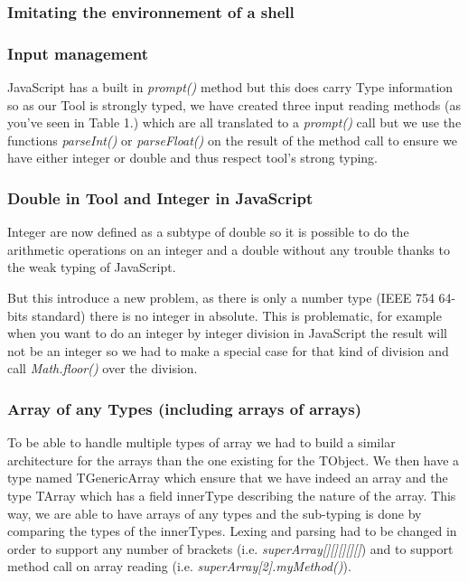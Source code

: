 \subsubsection{Imitating the environnement of a shell}
\subsubsection{Input management}
JavaScript has a built in \emph{prompt()} method but this does carry Type information so as our Tool is strongly typed, we have created three input reading methods (as you've seen in Table 1.) which are all translated to a \emph{prompt()} call but we use the functions \emph{parseInt()} or \emph{parseFloat()} on the result of the method call to ensure we have either integer or double and thus respect tool's strong typing.


\subsubsection{Double in Tool and Integer in JavaScript}
Integer are now defined as a subtype of double so it is possible to do the arithmetic operations on an integer and a double without any trouble thanks to the weak typing of JavaScript.

But this introduce a new problem, as there is only a number type (IEEE 754 64-bits standard) there is no integer in absolute. This is problematic, for example when you want to do an integer by integer division
in JavaScript the result will not be an integer so we had to make a special case for that kind of division and call \emph{Math.floor()} over the division.

\subsubsection{Array of any Types (including arrays of arrays)}
To be able to handle multiple types of array we had to build a similar architecture for the arrays than the one existing for the TObject. We then have a type named TGenericArray which ensure that we have indeed an array and the type TArray which has a field innerType describing the nature of the array.
This way, we are able to have arrays of any types and the sub-typing is done by comparing the types of the innerTypes.
Lexing and parsing had to be changed in order to support any number of brackets (i.e. \emph{superArray[][][][][]}) and to support method call on array reading (i.e. \emph{superArray[2].myMethod()}).

